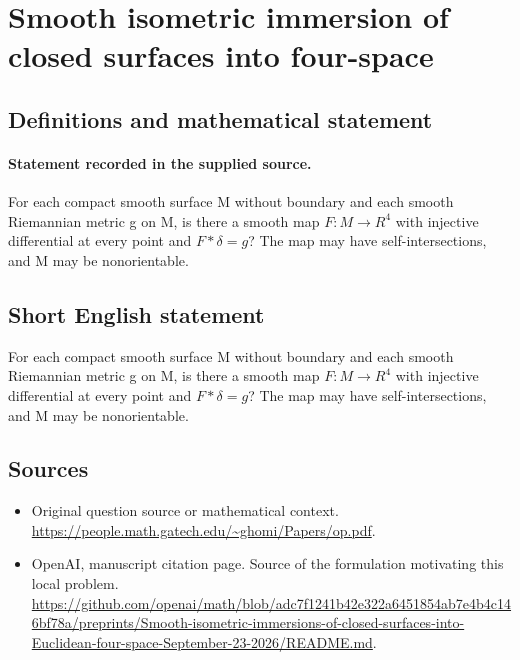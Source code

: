 \documentclass[11pt]{article}
\begin{document}
\section*{Smooth isometric immersion of closed surfaces into four-space}\label{30007137}
\subsection{Definitions and mathematical statement}
\paragraph{Statement recorded in the supplied source.}
For each compact smooth surface M without boundary and each smooth Riemannian metric g on M, is there a smooth map $F:M\to R^{4}$ with injective differential at every point and $F*\delta =g$? The map may have self-intersections, and M may be nonorientable.
\subsection{Short English statement}
For each compact smooth surface M without boundary and each smooth Riemannian metric g on M, is there a smooth map $F:M\to R^{4}$ with injective differential at every point and $F*\delta =g$? The map may have self-intersections, and M may be nonorientable.
\subsection{Sources}
\begin{itemize}
\item[S1] Original question source or mathematical context.
\url{https://people.math.gatech.edu/~ghomi/Papers/op.pdf}.
\item[S2] OpenAI, manuscript citation page. Source of the formulation motivating this local problem.
\url{https://github.com/openai/math/blob/adc7f1241b42e322a6451854ab7e4b4c146bf78a/preprints/Smooth-isometric-immersions-of-closed-surfaces-into-Euclidean-four-space-September-23-2026/README.md}.
\end{itemize}
\end{document}

